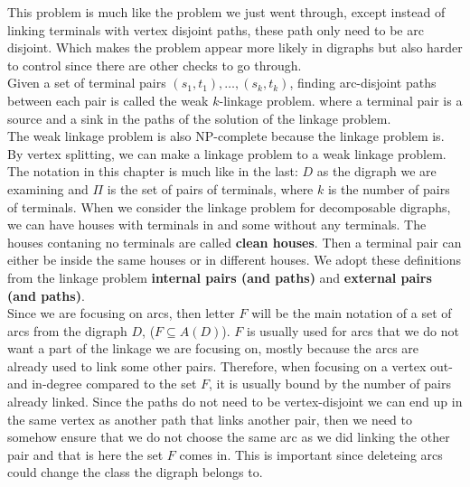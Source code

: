 This problem is much like the problem we just went through, except instead of linking terminals with vertex disjoint paths, these path only need to be arc disjoint.
Which makes the problem appear more likely in digraphs but also harder to control since there are other checks to go through. \\
Given a set of terminal pairs $(s_1,t_1),\dots ,(s_k,t_k)$, finding arc-disjoint paths between each pair is called the weak $k$-linkage problem.
where a terminal  pair is a source and a sink in the paths of the solution of the linkage problem. \\
The weak linkage problem is also NP-complete because the linkage problem is. 
By vertex splitting, we can make a linkage problem to a weak linkage problem. 
The notation in this chapter is much like in the last: $D$ as the digraph we are examining and $\Pi$ is the set of pairs of terminals, where $k$ is the number of pairs of terminals. 
When we consider the linkage problem for decomposable digraphs, we can have houses with terminals in and some without any terminals. 
The houses contaning no terminals are called \textbf{clean houses}.
Then a terminal pair can either be inside the same houses or in different houses. 
We adopt these definitions from the linkage problem \textbf{internal pairs (and paths)} and \textbf{external pairs (and paths)}.\\
Since we are focusing on arcs, then letter $F$ will be the main notation of a set of arcs from the digraph $D$, ($F\subseteq A(D)$). 
$F$ is usually used for arcs that we do not want a part of the linkage we are focusing on, mostly because the arcs are already used to link some other pairs. 
Therefore, when focusing on a vertex out- and in-degree compared to the set $F$, it is usually bound by the number of pairs already linked. 
Since the paths do not need to be vertex-disjoint we can end up in the same vertex as another path that links another pair, then we need to somehow ensure that we do not choose the same arc as we did linking the other pair and that is here the set $F$ comes in.  
This is important since deleteing arcs could change the class the digraph belongs to. 
